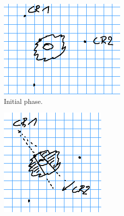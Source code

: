 \documentclass[english,RandD]{rapportPFE}  %
\begin{document}
				\begin{figure}[h!]
					\centering
					\begin{subfigure}[t]{0.3\linewidth}
						\centering
						\includegraphics[width=\linewidth]{graphics/triangle_1.png}
						\caption{Initial phase.}
						\label{fig:triangle_1}
					\end{subfigure}
					\hfill
					\begin{subfigure}[t]{0.3\linewidth}
						\centering
						\includegraphics[width=\linewidth]{graphics/triangle_2.png}

\end{subfigure}
\end{figure}
\end{document}
